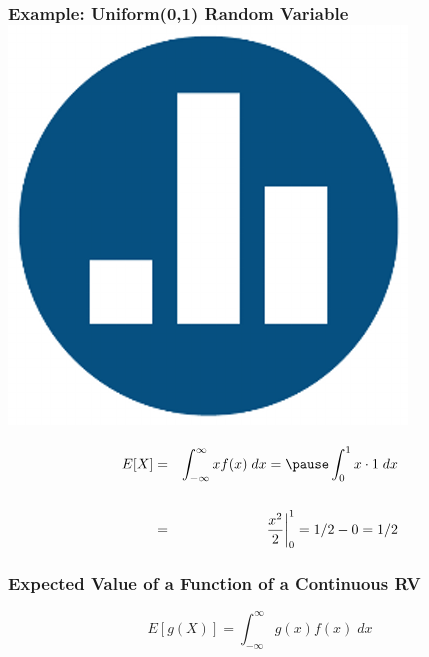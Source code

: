 \documentclass[handout]{beamer}
\begin{document}
\begin{frame}
\frametitle{Example: Uniform(0,1) Random Variable \hfill \includegraphics[scale = 0.05]{./images/clicker}}
\begin{eqnarray*}
	E[X] &=&  \int_{-\infty}^\infty x f(x) \; dx =\pause  \int_{0}^1 x \cdot 1 \; dx \\ \\
		&=&  \left.\frac{x^2}{2}\right|_0^1 = 1/2  - 0 = 1/2
\end{eqnarray*}
\end{frame}
\begin{frame}
\frametitle{Expected Value of a Function of a Continuous RV}
	$$\boxed{E[g(X)] = \int_{-\infty}^\infty g(x) f(x) \; dx}$$
\end{frame}


\end{document}
